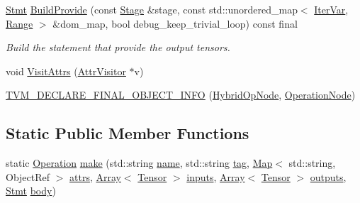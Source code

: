 \begin{DoxyCompactItemize}
\hyperlink{classtvm_1_1tir_1_1Stmt}{Stmt} \hyperlink{classtvm_1_1te_1_1HybridOpNode_a81a2e02ba86fad0ce7d31d0838ac46c0}{Build\+Provide} (const \hyperlink{classtvm_1_1te_1_1Stage}{Stage} \&stage, const std\+::unordered\+\_\+map$<$ \hyperlink{classtvm_1_1tir_1_1IterVar}{Iter\+Var}, \hyperlink{classtvm_1_1Range}{Range} $>$ \&dom\+\_\+map, bool debug\+\_\+keep\+\_\+trivial\+\_\+loop) const final
\begin{DoxyCompactList}\small\item\em Build the statement that provide the output tensors. \end{DoxyCompactList}\item 
void \hyperlink{classtvm_1_1te_1_1HybridOpNode_a7d3899d1fae8ae3877e3361704b4d35e}{Visit\+Attrs} (\hyperlink{classtvm_1_1AttrVisitor}{Attr\+Visitor} $\ast$v)
\item 
\hyperlink{classtvm_1_1te_1_1HybridOpNode_ac03095adaa19bc5c312b85657d33dadb}{T\+V\+M\+\_\+\+D\+E\+C\+L\+A\+R\+E\+\_\+\+F\+I\+N\+A\+L\+\_\+\+O\+B\+J\+E\+C\+T\+\_\+\+I\+N\+FO} (\hyperlink{classtvm_1_1te_1_1HybridOpNode}{Hybrid\+Op\+Node}, \hyperlink{classtvm_1_1te_1_1OperationNode}{Operation\+Node})
\end{DoxyCompactItemize}
\subsection*{Static Public Member Functions}
\begin{DoxyCompactItemize}
\item 
static \hyperlink{classtvm_1_1te_1_1Operation}{Operation} \hyperlink{classtvm_1_1te_1_1HybridOpNode_acdce863c448a5992b6399650d0305701}{make} (std\+::string \hyperlink{classtvm_1_1te_1_1OperationNode_ad2fd6f140257f7b3c311f88374fa74d2}{name}, std\+::string \hyperlink{classtvm_1_1te_1_1OperationNode_ae6ac4336e7dc2df84f128fc97a6cdb9b}{tag}, \hyperlink{classtvm_1_1Map}{Map}$<$ std\+::string, Object\+Ref $>$ \hyperlink{classtvm_1_1te_1_1OperationNode_a009ebd67a59953ec9a587f9724afd538}{attrs}, \hyperlink{classtvm_1_1Array}{Array}$<$ \hyperlink{classtvm_1_1te_1_1Tensor}{Tensor} $>$ \hyperlink{classtvm_1_1te_1_1HybridOpNode_a45104e4a1d31714b9eac76510d33fda5}{inputs}, \hyperlink{classtvm_1_1Array}{Array}$<$ \hyperlink{classtvm_1_1te_1_1Tensor}{Tensor} $>$ \hyperlink{classtvm_1_1te_1_1HybridOpNode_a6ff8e6faa8d01063e32a2c124721df29}{outputs}, \hyperlink{classtvm_1_1tir_1_1Stmt}{Stmt} \hyperlink{classtvm_1_1te_1_1HybridOpNode_a77124ad0787c8325f9ba556acdb62feb}{body})
\end{DoxyCompactItemize}
